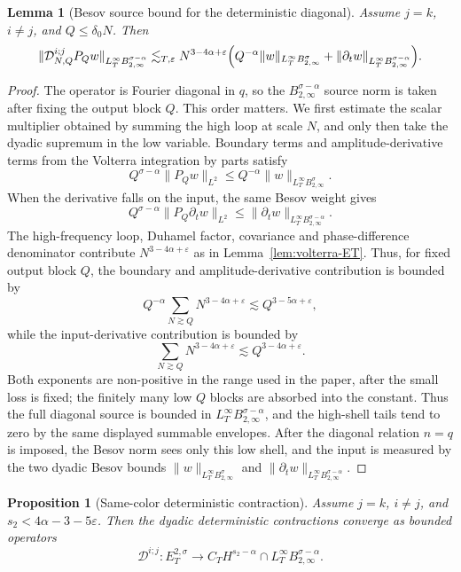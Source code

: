 \documentclass[10pt]{amsart}
\numberwithin{equation}{section}
\theoremstyle{plain}
\newtheorem{proposition}[theorem]{Proposition}
\newtheorem{lemma}[theorem]{Lemma}
\theoremstyle{definition}
\theoremstyle{remark}
\newcommand{\Btwo}{B_{2,\infty}}
\newcommand{\eps}{\varepsilon}
\begin{document}
\begin{lemma}[Besov source bound for the deterministic diagonal]\label{lem:volterra-besov-source}
Assume $j=k$, $i\ne j$, and $Q\le\delta_0N$.  Then
\begin{equation}\label{eq:volterra-besov-source}
\|\mathcal D_{N,Q}^{i;j}P_Qw\|_{L_T^\infty\Btwo^{\sigma-\alpha}}
\lesssim_{T,\eps}
N^{3-4\alpha+\eps}
\Bigl(Q^{-\alpha}\|w\|_{L_T^\infty\Btwo^\sigma}
      +\|\partial_tw\|_{L_T^\infty\Btwo^{\sigma-\alpha}}\Bigr).
\end{equation}
\end{lemma}

\begin{proof}
The operator is Fourier diagonal in $q$, so the $B_{2,\infty}^{\sigma-\alpha}$ source norm is taken after fixing the output block $Q$.  This order matters.  We first estimate the scalar multiplier obtained by summing the high loop at scale $N$, and only then take the dyadic supremum in the low variable.  Boundary terms and amplitude-derivative terms from the Volterra integration by parts satisfy
\[
Q^{\sigma-\alpha}\|P_Qw\|_{L^2}
\le Q^{-\alpha}\|w\|_{L_T^\infty\Btwo^\sigma}.
\]
When the derivative falls on the input, the same Besov weight gives
\[
Q^{\sigma-\alpha}\|P_Q\partial_tw\|_{L^2}
\le \|\partial_tw\|_{L_T^\infty\Btwo^{\sigma-\alpha}}.
\]
The high-frequency loop, Duhamel factor, covariance and phase-difference denominator contribute $N^{3-4\alpha+\eps}$ as in Lemma~\ref{lem:volterra-ET}.  Thus, for fixed output block $Q$, the boundary and amplitude-derivative contribution is bounded by
\[
        Q^{-\alpha}\sum_{N\gtrsim Q}N^{3-4\alpha+\eps}
        \lesssim Q^{3-5\alpha+\eps},
\]
while the input-derivative contribution is bounded by
\[
        \sum_{N\gtrsim Q}N^{3-4\alpha+\eps}
        \lesssim Q^{3-4\alpha+\eps}.
\]
Both exponents are non-positive in the range used in the paper, after the small loss is fixed; the finitely many low $Q$ blocks are absorbed into the constant.  Thus the full diagonal source is bounded in $L_T^\infty B_{2,\infty}^{\sigma-\alpha}$, and the high-shell tails tend to zero by the same displayed summable envelopes.  After the diagonal relation $n=q$ is imposed, the Besov norm sees only this low shell, and the input is measured by the two dyadic Besov bounds $\|w\|_{L_T^\infty B_{2,\infty}^\sigma}$ and $\|\partial_tw\|_{L_T^\infty B_{2,\infty}^{\sigma-\alpha}}$.
\end{proof}


\begin{proposition}[Same-color deterministic contraction]\label{prop:det-contraction}
Assume $j=k$, $i\ne j$, and $s_2<4\alpha-3-5\eps$.  Then the dyadic deterministic contractions converge as bounded operators
\begin{equation}\label{eq:det-contraction-bound}
\mathcal D^{i;j}:E_T^{2,\sigma}\longrightarrow C_TH^{s_2-\alpha}\cap L_T^\infty\Btwo^{\sigma-\alpha}.
\end{equation}
\end{proposition}
\end{document}
